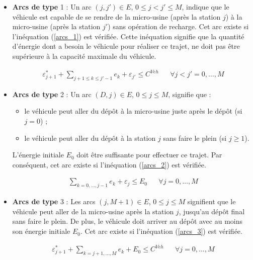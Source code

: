 \begin{itemize}[label=$\square$]
	
	\item \textbf{Arcs de type} 1 : Un arc $(j,j' ) \in E$, $0\leq j<j'\leq M$, indique que le véhicule est capable de se rendre de la micro-usine (après la station $j$) à la micro-usine (après la station $j'$) sans opération de recharge. Cet arc existe si l'inéquation (\ref{arcs_1}) est vérifiée. Cette inéquation signifie que la quantité d'énergie dont a besoin le véhicule pour réaliser ce trajet, ne doit pas être supérieure à la capacité maximale du véhicule.
	
	\begin{equation}\label{arcs_1}
	\begin{align}
	\varepsilon^*_{j+1}+\sum_{j+1 \leq k \leq j'-1} e_k + \varepsilon_{j'} \leq C^{Veh}&  & \forall j < j'= 0, \dots, M
	\end{align}
	\end{equation}
	
	\item \textbf{Arcs de type} 2 : Un arc $(D,j)\in E$, $0 \leq j \leq M$, signifie que :
	\begin{itemize}
		\item le véhicule peut aller du dépôt à la micro-usine juste après le dépôt (si $j=0$) ;
		\item le véhicule peut aller du dépôt à la station $j$ sans faire le plein (si $j\geq1$).
	\end{itemize}
	L'énergie initiale $E_0$ doit être suffisante pour effectuer ce trajet. Par conséquent, cet arc existe si l'inéquation (\ref{arcs_2}) est vérifiée.
	
	\begin{equation}\label{arcs_2}
	\begin{align}
	\sum_{k=0, \dots, j-1} e_k + \varepsilon_{j} \leq E_0&  & \forall j = 0, \dots, M
	\end{align}
	\end{equation}
	
	\item \textbf{Arcs de type} 3 : Les arcs $(j,M+1) \in E$, $0 \leq j\leq M$ signifient que le véhicule peut aller de la micro-usine après la station $j$, jusqu'au dépôt final sans faire le plein. De plus, le véhicule doit arriver au dépôt avec au moins son énergie initiale $E_0$. Cet arc existe si l'inéquation (\ref{arcs_3}) est vérifiée.
	
	\begin{equation}\label{arcs_3}
	\begin{align}
	\varepsilon^*_{j+1}+\sum_{k=j+1, \dots, M} e_k + E_0\leq C^{Veh}&  & \forall j = 0, \dots, M
	\end{align}
	\end{equation}
	
\end{itemize}

